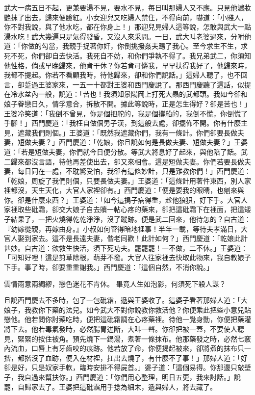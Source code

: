 \begin{showcontents}{}
武大一病五日不起，更兼要湯不見，要水不見，每日叫那婦人又不應。只見他濃妝艷抹了出去，歸來便臉紅。小女迎兒又吃婦人禁住，不得向前，嚇道：「小賤人，你不對我說，與了他水吃，都在你身上！」那迎兒見婦人這等說，怎敢與武大一點湯水吃！武大幾遍只是氣得發昏，又沒人來采問。一日，武大叫老婆過來，分咐他道：「你做的勾當，我親手捉著你奸，你倒挑撥姦夫踢了我心。至今求生不生，求死不死，你們卻自去快活。我死自不妨，和你們爭執不得了。我兄弟武二，你須知他性格，倘或早晚歸來，他肯干休？你若肯可憐我，早早扶得我好了，他歸來時，我都不提起。你若不看顧我時，待他歸來，卻和你們說話。」這婦人聽了，也不回言，卻踅過王婆家來，一五一十都對王婆和西門慶說了。那西門慶聽了這話，似提在冷水盆內一般，說道：「苦也！我須知景陽岡上打死大蟲的武都頭。我如今卻和娘子眷戀日久，情孚意合，拆散不開。據此等說時，正是怎生得好？卻是苦也！」王婆冷笑道：「我倒不曾見，你是個把舵的，我是個撐船的，我倒不慌，你倒慌了手腳！」西門慶道：「我枉自做個男子漢，到這般去處，卻擺佈不開。你有什麼主見，遮藏我們則個。」王婆道：「既然我遮藏你們，我有一條計。你們卻要長做夫妻，短做夫妻？」西門慶道：「乾娘，你且說如何是長做夫妻、短做夫妻？」王婆道：「若是短做夫妻，你們就今日便分散。等武大將息好了起來，與他陪了話。武二歸來都沒言語，待他再差使出去，卻又來相會。這是短做夫妻。你們若要長做夫妻，每日同在一處，不耽驚受怕，我卻有這條妙計，只是難教你們！」西門慶道： 「乾娘，周旋了我們則個，只要長做夫妻。」王婆道：「這條計用著件東西，別人家裡都沒，天生天化，大官人家裡卻有。」西門慶道：「便是要我的眼睛，也剜來與你。卻是什麼東西？」王婆道：「如今這搗子病得重，趁他狼狽，好下手。大官人家裡取些砒霜，卻交大娘子自去贖一帖心疼的藥來，卻把這砒霜下在裡面，把這矮子結果了，一把火燒得乾乾淨淨，沒了蹤跡。便是武二回來，他待怎的？自古道：『幼嫁從親，再嫁由身。』小叔如何管得暗地裡事！半年一載，等待夫孝滿日，大官人娶到家去。這不是長遠夫妻，偕老同歡！此計如何？」西門慶道：「乾娘此計甚妙。自古道：欲救生快活，須下死功夫。罷罷罷！一不做，二不休。」王婆道：「可知好哩！這是剪草除根，萌芽不發。大官人往家裡去快取此物來，我自教娘子下手。事了時，卻要重重謝我。」西門慶道：「這個自然，不消你說。」

雲情雨意兩綢繆，戀色迷花不肯休。
畢竟人生如泡影，何須死下殺人謀？

且說西門慶去不多時，包了一包砒霜，遞與王婆收了。這婆子看著那婦人道：「大娘子，我教你下藥的法兒。如今武大不對你說教你救活他？你便乘此把些小意兒貼戀他。他若問你討藥吃時，便把這砒霜調在心疼藥裡。待他一覺身動，你便把藥灌將下去。他若毒氣發時，必然腸胃迸斷，大叫一聲。你卻把被一蓋，不要使人聽見，緊緊的按住被角。預先燒下一鍋湯，煮著一條抹布。他那藥發之時，必然七竅內流血，口唇上有牙齒咬的痕跡。他若放了命，你便揭起被來，卻將煮的抹布只一揩，都揩沒了血跡，便入在材裡，扛出去燒了，有什麼不了事！」那婦人道：「好卻是好，只是奴家手軟，臨時安排不得屍首。」婆子道：「這個易得。你那邊只敲壁子，我自過來幫扶你。」西門慶道：「你們用心整理，明日五更，我來討話。」說罷，自歸家去了。王婆把這砒霜用手捻為細末，遞與婦人，將去藏了。


\end{showcontents}
